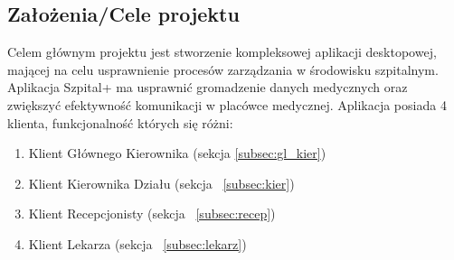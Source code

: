 \begin{flushleft}
\section{\LARGE{Założenia/Cele projektu}}
\end{flushleft}

\begin{flushleft}
\large{\hspace{5mm}Celem głównym projektu jest stworzenie kompleksowej aplikacji desktopowej, mającej na celu usprawnienie procesów zarządzania w środowisku szpitalnym. Aplikacja \textquotedbl Szpital+\textquotedbl{} ma usprawnić gromadzenie danych medycznych oraz zwiększyć efektywność komunikacji w placówce medycznej. Aplikacja posiada 4 klienta, funkcjonalność których się różni:}
\renewcommand{\labelenumi}{\alph{enumi})}
\begin{enumerate}
    \item{Klient Głównego Kierownika (sekcja \ref{subsec:gl_kier})}
    \item{Klient Kierownika Działu (sekcja ~\ref{subsec:kier})} 
    \item{Klient Recepcjonisty (sekcja ~\ref{subsec:recep})}
    \item{Klient Lekarza (sekcja ~\ref{subsec:lekarz})}
\end{enumerate}
\end{flushleft}